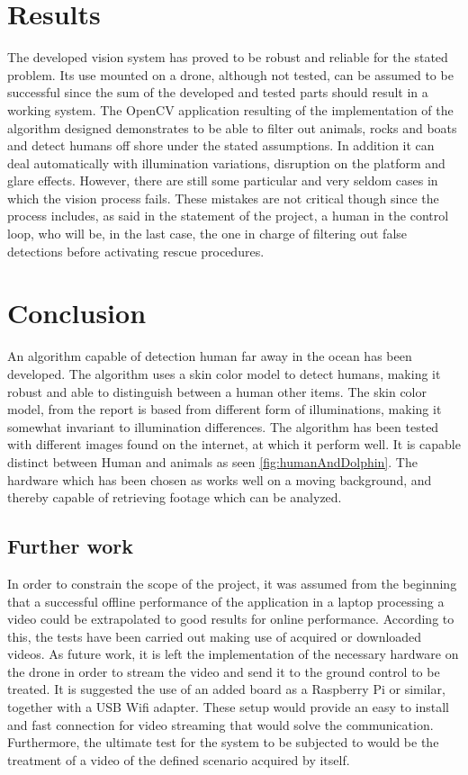 \section{Results}
The developed vision system has proved to be robust and reliable for the stated problem.
Its use mounted on a drone, although not tested, can be assumed to be successful since the sum
of the developed and tested parts should result in a working system.
The OpenCV application resulting of the implementation of the algorithm designed demonstrates to be able to filter out animals,
rocks and boats and detect humans off shore under the stated assumptions. 
In addition it can deal automatically with illumination variations, disruption on the platform and glare effects.
However, there are still some particular and very seldom cases in which the vision process fails. 
These mistakes are not critical though since the process includes, as said in the statement of the project,
a human in the control loop, who will be, in the last case, the one in charge of filtering out false detections before activating rescue procedures.

\section{Conclusion}

An algorithm capable of detection human far away in the ocean has been developed. 
The algorithm uses a skin color model to detect humans,
making it robust and able to distinguish between a human other items.
The skin color model, from the report \cite{Ref:SkinDetection} is based from different form of illuminations, 
making it somewhat invariant to illumination differences. 
The algorithm has been tested with different images found on the internet,
at which it perform well. It is capable distinct between Human and animals as seen \ref{fig:humanAndDolphin}.
The hardware which has been chosen as works well on a moving background,
and thereby capable of retrieving footage which can be analyzed. 

\subsection{Further work} 
In order to constrain the scope of the project, it was assumed from the beginning that a successful offline
performance of the application in a laptop processing a video could be extrapolated to good results for online performance. 
According to this, the tests have been carried out making use of acquired or downloaded videos.
As future work, it is left the implementation of the necessary hardware on the drone in order to stream the video
and send it to the ground control to be treated.
It is suggested the use of an added board as a Raspberry Pi or similar, together with a USB Wifi adapter.
These setup would provide an easy to install and fast connection for video streaming that would solve the communication.
Furthermore, the ultimate test for the system to be subjected to would be the treatment of a video of the defined scenario acquired by itself. 



\newpage